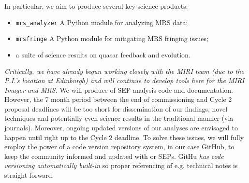 \noindent
In particular, we aim to produce several key science products:
\begin{itemize}
\item {\tt mrs\_analyzer} A Python module for analyzing MRS data; 
\item {\tt mrsfringe} A Python module for mitigating MRS fringing issues; 
\item a suite of science results on quasar feedback and evolution. 
\end{itemize}

\noindent
{\it Critically, we have already begun working closely with the MIRI team (due to the P.I.'s location at Edinburgh) and will continue to develop tools here for the MIRI Imager and MRS.}
We will produce of SEP analysis code and documentation.  However, the 7
month period between the end of commissioning and Cycle 2 proposal
deadlines will be too short for dissemination of our findings, novel
techniques and potentially even science results in the traditional
manner (via journals). Moreover, ongoing updated versions 
of our analyses are envisaged to happen until right up to the Cycle 2 deadline. 
To solve these issues, we will fully employ the power of a code version
repository system, in our case GitHub, to keep the community informed
and updated with or SEPs. GitHu {\it has code versioning automatically
built-in} so proper referencing of e.g. technical notes is straight-forward. 






